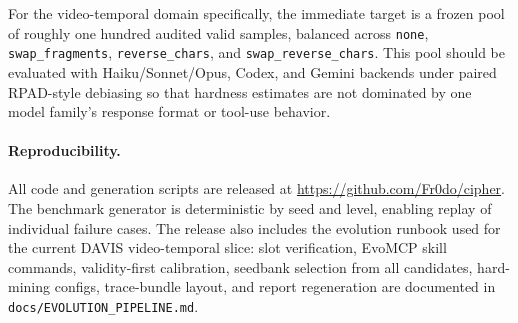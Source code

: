 For the video-temporal domain specifically, the immediate target is a frozen
pool of roughly one hundred audited valid samples, balanced across
\texttt{none}, \texttt{swap\_fragments}, \texttt{reverse\_chars}, and
\texttt{swap\_reverse\_chars}. This pool should be evaluated with
Haiku/Sonnet/Opus, Codex, and Gemini backends under paired RPAD-style debiasing
so that hardness estimates are not dominated by one model family's response
format or tool-use behavior.

\paragraph{Reproducibility.}
All code and generation scripts are released at
\url{https://github.com/Fr0do/cipher}. The benchmark generator is deterministic
by seed and level, enabling replay of individual failure cases. The release
also includes the evolution runbook used for the current DAVIS video-temporal
slice: slot verification, EvoMCP skill commands, validity-first calibration,
seedbank selection from all candidates, hard-mining configs, trace-bundle
layout, and report regeneration are documented in
\texttt{docs/EVOLUTION\_PIPELINE.md}.
